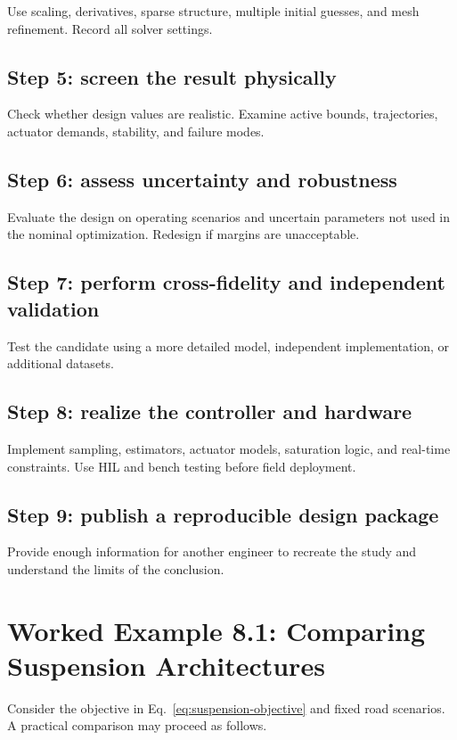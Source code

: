\documentclass[11pt]{article}
\begin{document}
Use scaling, derivatives, sparse structure, multiple initial guesses, and mesh refinement. Record all solver settings.

\subsection{Step 5: screen the result physically}

Check whether design values are realistic. Examine active bounds, trajectories, actuator demands, stability, and failure modes.

\subsection{Step 6: assess uncertainty and robustness}

Evaluate the design on operating scenarios and uncertain parameters not used in the nominal optimization. Redesign if margins are unacceptable.

\subsection{Step 7: perform cross-fidelity and independent validation}

Test the candidate using a more detailed model, independent implementation, or additional datasets.

\subsection{Step 8: realize the controller and hardware}

Implement sampling, estimators, actuator models, saturation logic, and real-time constraints. Use HIL and bench testing before field deployment.

\subsection{Step 9: publish a reproducible design package}

Provide enough information for another engineer to recreate the study and understand the limits of the conclusion.

\section{Worked Example 8.1: Comparing Suspension Architectures}

Consider the objective in Eq.~\eqref{eq:suspension-objective} and fixed road scenarios. A practical comparison may proceed as follows.
\end{document}
